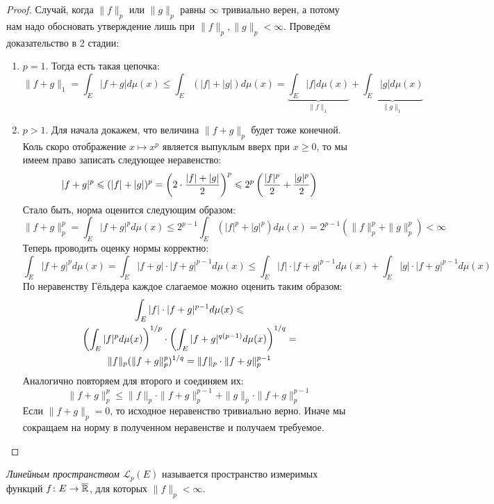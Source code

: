 \begin{proof}
	Случай, когда $\|f\|_p$ или $\|g\|_p$ равны $\infty$ тривиально верен, а потому нам надо обосновать утверждение лишь при $\|f\|_p, \|g\|_p < \infty$. Проведём доказательство в 2 стадии:
	\begin{enumerate}
		\item $p = 1$. Тогда есть такая цепочка:
		\[
			\|f + g\|_1 = \int_E |f + g|d\mu(x) \le \int_E (|f| + |g|)d\mu(x) = \underbrace{\int_E |f|d\mu(x)}_{\|f\|_1} + \underbrace{\int_E |g|d\mu(x)}_{\|g\|_1}
		\]
		
		\item $p > 1$. Для начала докажем, что величина $\|f + g\|_p$ будет тоже конечной. Коль скоро отображение $x \mapsto x^p$ является выпуклым вверх при $x \ge 0$, то мы имеем право записать следующее неравенство:
		\[
			|f + g|^p \leqslant (|f| + |g|)^p  = \left(2 \cdot \frac{|f| + |g|}{2}\right)^p \leqslant 2^p \left(\frac{|f|^p}{2} + \frac{|g|^p}{2}\right)
		\]
		Стало быть, норма оценится следующим образом:
		\[
			\|f + g\|_p^p = \int_E |f + g|^pd\mu(x) \le 2^{p - 1} \int_E (|f|^p + |g|^p)d\mu(x) = 2^{p - 1}(\|f\|_p^p + \|g\|_p^p) < \infty
		\]
		Теперь проводить оценку нормы корректно:
		\[
			\int_E |f + g|^pd\mu(x) = \int_E |f + g| \cdot |f + g|^{p - 1}d\mu(x) \le \int_E |f| \cdot |f + g|^{p - 1}d\mu(x) + \int_E |g| \cdot |f + g|^{p - 1}d\mu(x)
		\]
		По неравенству Гёльдера каждое слагаемое можно оценить таким образом:
		\begin{multline*}
			\int_E |f| \cdot |f + g|^{p - 1}d\mu(x) \leqslant 
			\\
			\left(\int_E |f|^pd\mu(x)\right)^{1 / p} \cdot \left(\int_E |f + g|^{q(p - 1)}d\mu(x)\right)^{1 / q} =
			\\
			\|f\|_p (\|f + g\|_p^p)^{1 / q} = \|f\|_p \cdot \|f + g\|_p^{p - 1}
		\end{multline*}
		Аналогично повторяем для второго и соединяем их:
		\[
			\|f + g\|_p^p \le \|f\|_p \cdot \|f + g\|_p^{p - 1} + \|g\|_p \cdot \|f + g\|_p^{p - 1}
		\]
		Если $\|f + g\|_p = 0$, то исходное неравенство тривиально верно. Иначе мы сокращаем на норму в полученном неравенстве и получаем требуемое.
	\end{enumerate}
\end{proof}

\begin{definition}
	\textit{Линейным пространством $\mathcal{L}_p(E)$} называется пространство измеримых функций $f \colon E \to \overline{\mathbb{R}}$, для которых $\|f\|_p < \infty$.
\end{definition}

